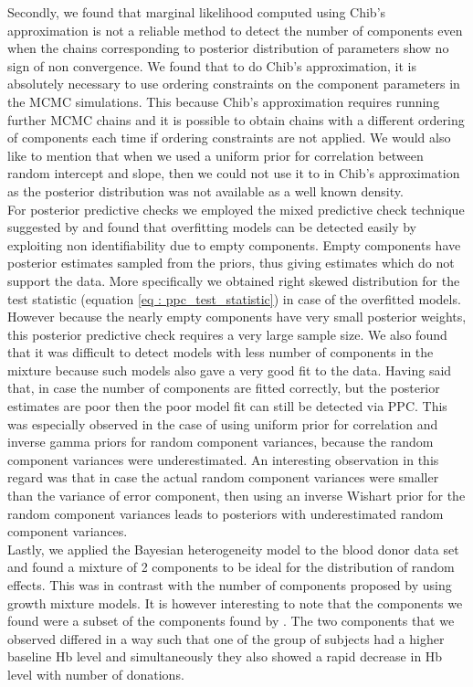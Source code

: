 Secondly, we found that marginal likelihood computed using Chib's approximation is not a reliable method to detect the number of components even when the chains corresponding to posterior distribution of parameters show no sign of non convergence. We found that to do Chib's approximation, it is absolutely necessary to use ordering constraints on the component parameters in the MCMC simulations. This because Chib's approximation requires running further MCMC chains and it is possible to obtain chains with a different ordering of components each time if ordering constraints are not applied. We would also like to mention that when we used a uniform prior for correlation between random intercept and slope, then we could not use it to in Chib's approximation as the posterior distribution was not available as a well known density.\\

For posterior predictive checks we employed the mixed predictive check technique suggested by \citet{marshall_approximate_2003} and found that overfitting models can be detected easily by exploiting non identifiability due to empty components. Empty components have posterior estimates sampled from the priors, thus giving estimates which do not support the data. More specifically we obtained right skewed distribution for the test statistic (equation \ref{eq : ppc_test_statistic}) in case of the overfitted models. However because the nearly empty components have very small posterior weights, this posterior predictive check requires a very large sample size. We also found that it was difficult to detect models with less number of components in the mixture because such models also gave a very good fit to the data. Having said that, in case the number of components are fitted correctly, but the posterior estimates are poor then the poor model fit can still be detected via PPC. This was especially observed in the case of using uniform prior for correlation and inverse gamma priors for random component variances, because the random component variances were underestimated. An interesting observation in this regard was that in case the actual random component variances were smaller than the variance of error component, then using an inverse Wishart prior for the random component variances leads to posteriors with underestimated random component variances.\\

Lastly, we applied the Bayesian heterogeneity model to the blood donor data set and found a mixture of 2 components to be ideal for the distribution of random effects. This was in contrast with the number of components proposed by \citet{nasserinejad_prevalence_2015} using growth mixture models. It is however interesting to note that the components we found were a subset of the components found by \citet{nasserinejad_prevalence_2015}. The two components that we observed differed in a way such that one of the group of subjects had a higher baseline Hb level and simultaneously they also showed a rapid decrease in Hb level with number of donations.